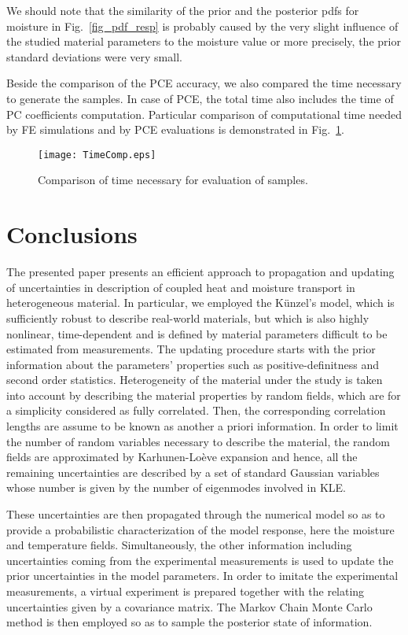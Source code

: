 \documentclass[preprint,12pt]{elsarticle}
\begin{document}
We should note that the similarity of the prior and the posterior
pdfs for moisture in Fig.~\ref{fig_pdf_resp} is probably caused by
the very slight influence of the studied material parameters to
the moisture value or more precisely, the prior standard
deviations were very small.

Beside the comparison of the PCE accuracy, we also compared the time
necessary to generate the samples. In case of PCE, the total time also
includes the time of PC coefficients computation. Particular
comparison of computational time needed by FE simulations and by PCE
evaluations is demonstrated in Fig.~\ref{fig_timecomp}.
\begin{figure} [ht!]
\centering
\texttt{[image: TimeComp.eps]}
\caption{Comparison of time necessary for evaluation of samples.}
\label{fig_timecomp}
\end{figure}

\section{Conclusions}
\label{sec:concl}
The presented paper presents an efficient approach to propagation
and updating of uncertainties in description of coupled heat and
moisture transport in heterogeneous material. In particular, we
employed the K\"unzel's model, which is sufficiently robust to
describe real-world materials, but which is also highly nonlinear,
time-dependent and is defined by  material parameters difficult
to be estimated from measurements. The updating procedure starts
with the prior information about the parameters' properties such
as positive-definitness and second order statistics. Heterogeneity
of the material under the study is taken into account by
describing the material properties by random fields, which are for
a simplicity considered as fully correlated. Then, the
corresponding correlation lengths are assume to be known as
another a priori information. In order to limit the number of
random variables necessary to describe the material, the random
fields are approximated by Karhunen-Lo\`eve expansion and hence,
all the remaining uncertainties are described by a set of standard
Gaussian variables whose number is given by the number of
eigenmodes involved in KLE.

These uncertainties are then propagated through the numerical
model so as to provide a probabilistic characterization of the
model response, here the moisture and temperature fields.
Simultaneously, the other information including uncertainties
coming from the experimental measurements is used to update the
prior uncertainties in the model parameters. In order to imitate
the experimental measurements, a virtual experiment is prepared
together with the relating uncertainties given by a covariance
matrix. The Markov Chain Monte Carlo method is then employed so as
to sample the posterior state of information.
\end{document}
